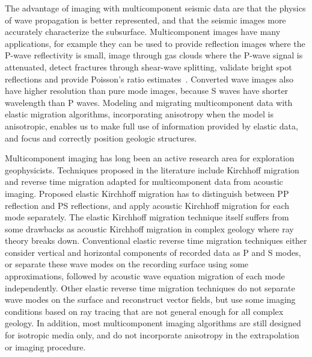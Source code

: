           
% 
The advantage of imaging with multicomponent seismic data are that the physics of wave propagation is better represented, and that the seismic images more accurately characterize the subsurface. Multicomponent images have many applications, for example they can be used to provide reflection images where the P-wave reflectivity is small, image through gas clouds where the P-wave signal is attenuated, detect fractures through shear-wave splitting, validate bright spot reflections and provide Poisson's ratio estimates~\cite[]{simmons:1227}. 
Converted wave images also have higher resolution than pure mode images, because S waves have shorter wavelength than P waves. 
Modeling and migrating multicomponent data with elastic migration algorithms, incorporating anisotropy when the model is anisotropic, enables us to make full use of information provided by elastic data, and focus and correctly position geologic structures.



Multicomponent imaging has long been an active research area for exploration geophysicists. Techniques proposed in the literature include Kirchhoff migration and reverse time migration adapted for multicomponent data from acoustic imaging. Proposed elastic Kirchhoff migration has to distinguish between PP reflection and PS reflections, and apply acoustic Kirchhoff migration for each mode separately. The elastic Kirchhoff migration technique itself suffers from some drawbacks as acoustic Kirchhoff migration in complex geology where ray theory breaks down. Conventional elastic reverse time migration techniques either consider vertical and horizontal components of recorded data as P and S modes, or separate these wave modes on the recording surface using some approximations, followed by acoustic wave equation migration of each mode independently. Other elastic reverse time migration techniques do not separate wave modes on the surface and reconstruct vector fields, but use some imaging conditions based on ray tracing that are not general enough for all complex geology. In addition, most multicomponent imaging algorithms are still designed for isotropic media only, and do not incorporate anisotropy in the extrapolation or imaging procedure.


